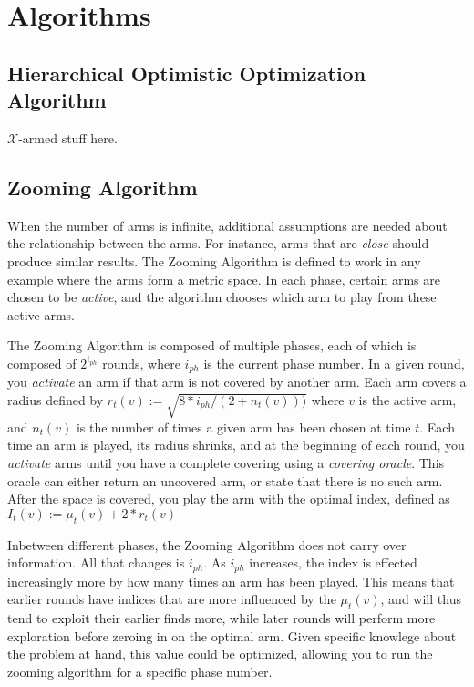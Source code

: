 \section{Algorithms}
\subsection{Hierarchical Optimistic Optimization Algorithm}
$\mathcal{X}$-armed stuff here.

\subsection{Zooming Algorithm}
When the number of arms is infinite, additional assumptions are needed
about the relationship between the arms. For instance, arms
that are \emph{close} should produce similar results. The Zooming
Algorithm is defined to work in any example where the arms form a
metric space. In each phase, certain arms are chosen to be
\emph{active}, and the algorithm chooses which arm to play from these
active arms.

The Zooming Algorithm is composed of multiple phases, each of which is
composed of $2^{i_{ph}}$ rounds, where $i_{ph}$ is the current phase
number. In a given round, you \emph{activate} an arm if that arm is
not covered by another arm. Each arm covers a radius defined by
$r_t(v):=\sqrt{8*i_{ph}/(2+n_t(v)))}$ where $v$ is the active arm, and
$n_t(v)$ is the number of times a given arm has been chosen at time
$t$. Each time an arm is played, its radius shrinks, and at the
beginning of each round, you \emph{activate} arms until you have a
complete covering using a \emph{covering oracle}. This oracle can
either return an uncovered arm, or state that there is no such
arm. After the space is covered, you play the arm with the optimal
index, defined as $I_t(v):=\mu_t(v)+2*r_t(v)$

Inbetween different phases, the Zooming Algorithm does not carry
over information. All that changes is $i_{ph}$. As $i_{ph}$ increases,
the index is effected increasingly more by how many times an arm has
been played. This means that earlier rounds have indices that are more
influenced by the $\mu_t(v)$, and will thus tend to exploit their earlier
finds more, while later rounds will perform more exploration before zeroing
in on the optimal arm. Given specific knowlege about the problem at hand,
this value could be optimized, allowing you to run the zooming algorithm
for a specific phase number. 

